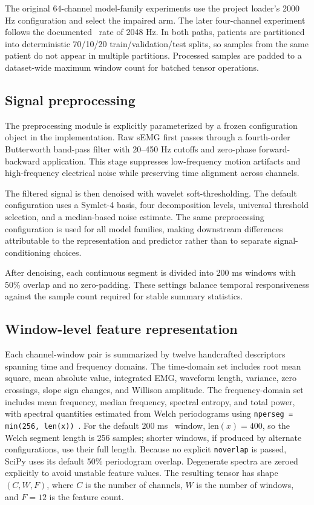 The original 64-channel model-family experiments use the project loader's 2000 Hz configuration and select the impaired arm. The later four-channel experiment follows the documented \physiomio\ rate of 2048 Hz. In both paths, patients are partitioned into deterministic 70/10/20 train/validation/test splits, so samples from the same patient do not appear in multiple partitions. Processed samples are padded to a dataset-wide maximum window count for batched tensor operations.

\subsection{Signal preprocessing}

The preprocessing module is explicitly parameterized by a frozen configuration object in the implementation. Raw sEMG first passes through a fourth-order Butterworth band-pass filter with 20--450 Hz cutoffs and zero-phase forward-backward application. This stage suppresses low-frequency motion artifacts and high-frequency electrical noise while preserving time alignment across channels.

The filtered signal is then denoised with wavelet soft-thresholding. The default configuration uses a Symlet-4 basis, four decomposition levels, universal threshold selection, and a median-based noise estimate. The same preprocessing configuration is used for all model families, making downstream differences attributable to the representation and predictor rather than to separate signal-conditioning choices.

After denoising, each continuous segment is divided into 200 ms windows with 50\% overlap and no zero-padding. These settings balance temporal responsiveness against the sample count required for stable summary statistics.

\subsection{Window-level feature representation}

Each channel-window pair is summarized by twelve handcrafted descriptors spanning time and frequency domains. The time-domain set includes root mean square, mean absolute value, integrated EMG, waveform length, variance, zero crossings, slope sign changes, and Willison amplitude. The frequency-domain set includes mean frequency, median frequency, spectral entropy, and total power, with spectral quantities estimated from Welch periodograms using \texttt{nperseg = min(256, len(x))}~\citep{welch1967fft}. For the default 200 ms \physiomio\ window, $\mathrm{len}(x)=400$, so the Welch segment length is 256 samples; shorter windows, if produced by alternate configurations, use their full length. Because no explicit \texttt{noverlap} is passed, SciPy uses its default 50\% periodogram overlap. Degenerate spectra are zeroed explicitly to avoid unstable feature values. The resulting tensor has shape $(C, W, F)$, where $C$ is the number of channels, $W$ is the number of windows, and $F=12$ is the feature count.

